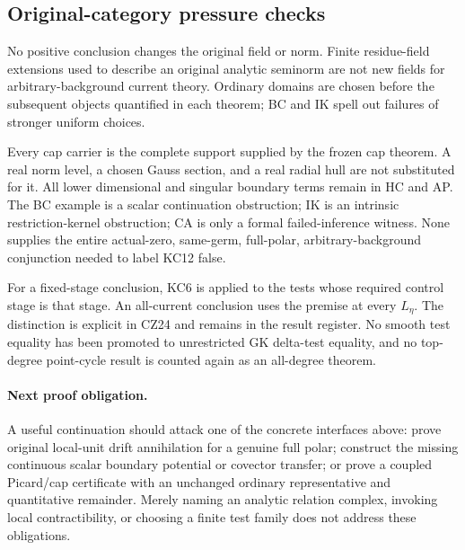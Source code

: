\subsection{Original-category pressure checks}

No positive conclusion changes the original field or norm.
Finite residue-field extensions used to describe an original
analytic seminorm are not new fields for arbitrary-background
current theory.  Ordinary domains are chosen before the
subsequent objects quantified in each theorem; BC and IK spell
out failures of stronger uniform choices.

Every cap carrier is the complete support supplied by the
frozen cap theorem.  A real norm level, a chosen Gauss section,
and a real radial hull are not substituted for it.  All lower
dimensional and singular boundary terms remain in HC and AP.
The BC example is a scalar continuation obstruction; IK is an
intrinsic restriction-kernel obstruction; CA is only a formal
failed-inference witness.  None supplies the entire actual-zero,
same-germ, full-polar, arbitrary-background conjunction needed
to label KC12 false.

For a fixed-stage conclusion, KC6 is applied to the tests whose
required control stage is that stage.  An all-current conclusion
uses the premise at every \(L_\eta\).  The distinction is
explicit in CZ24 and remains in the result register.  No smooth
test equality has been promoted to unrestricted GK delta-test
equality, and no top-degree point-cycle result is counted again
as an all-degree theorem.

\paragraph{Next proof obligation.}
A useful continuation should attack one of the concrete interfaces
above: prove original local-unit drift annihilation for a genuine
full polar; construct the missing continuous scalar boundary
potential or covector transfer; or prove a coupled Picard/cap
certificate with an unchanged ordinary representative and
quantitative remainder.  Merely naming an analytic relation
complex, invoking local contractibility, or choosing a finite
test family does not address these obligations.
